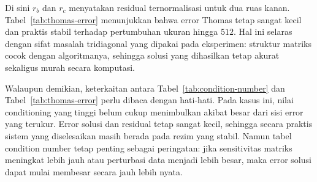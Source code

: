 \documentclass[12pt,a4paper]{article}
\begin{document}
\begin{table}[h]
\centering
\caption{Error Thomas algorithm pada matriks tridiagonal sampai ukuran $512$.}
\label{tab:thomas-error}
\end{table}

Di sini $r_b$ dan $r_c$ menyatakan residual ternormalisasi untuk dua ruas kanan. Tabel~\ref{tab:thomas-error} menunjukkan bahwa error Thomas tetap sangat kecil dan praktis stabil terhadap pertumbuhan ukuran hingga $512$. Hal ini selaras dengan sifat masalah tridiagonal yang dipakai pada eksperimen: struktur matriks cocok dengan algoritmanya, sehingga solusi yang dihasilkan tetap akurat sekaligus murah secara komputasi.

Walaupun demikian, keterkaitan antara Tabel~\ref{tab:condition-number} dan Tabel~\ref{tab:thomas-error} perlu dibaca dengan hati-hati. Pada kasus ini, nilai conditioning yang tinggi belum cukup menimbulkan akibat besar dari sisi error yang terukur. Error solusi dan residual tetap sangat kecil, sehingga secara praktis sistem yang diselesaikan masih berada pada rezim yang stabil. Namun tabel condition number tetap penting sebagai peringatan: jika sensitivitas matriks meningkat lebih jauh atau perturbasi data menjadi lebih besar, maka error solusi dapat mulai membesar secara jauh lebih nyata.
\end{document}
